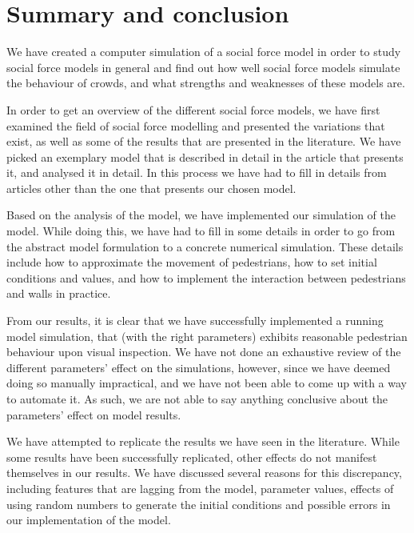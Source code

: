\section{Summary and conclusion}
\label{sec:conclusion}

We have created a computer simulation of a social force model in order to 
study social force models in general and find out how well social force models 
simulate the behaviour of crowds, and what strengths and weaknesses of these 
models are.

In order to get an overview of the different social force models, we have 
first examined the field of social force modelling and presented the 
variations that exist, as well as some of the results that are presented in 
the literature. We have picked an exemplary model that is described in detail 
in the article that presents it, and analysed it in detail. In this process we 
have had to fill in details from articles other than the one that presents our 
chosen model.

Based on the analysis of the model, we have implemented our simulation of the 
model. While doing this, we have had to fill in some details in order to go 
from the abstract model formulation to a concrete numerical simulation. These 
details include how to approximate the movement of pedestrians, how to set 
initial conditions and values, and how to implement the interaction between 
pedestrians and walls in practice.

From our results, it is clear that we have successfully implemented a running 
model simulation, that (with the right parameters) exhibits reasonable 
pedestrian behaviour upon visual inspection. We have not done an exhaustive 
review of the different parameters' effect on the simulations, however, since 
we have deemed doing so manually impractical, and we have not been able to 
come up with a way to automate it. As such, we are not able to say anything 
conclusive about the parameters' effect on model results.

We have attempted to replicate the results we have seen in the literature.  
While some results have been successfully replicated, other effects do not 
manifest themselves in our results. We have discussed several reasons for this 
discrepancy, including features that are lagging from the model, parameter 
values, effects of using random numbers to generate the initial conditions and 
possible errors in our implementation of the model.

